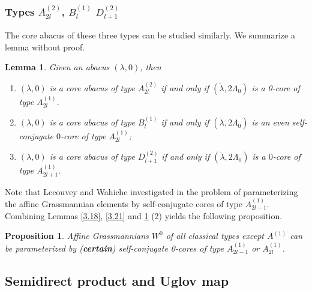 \documentclass[11pt]{amsart}
\theoremstyle{plain}
\numberwithin{equation}{subsection}
\newtheorem{lemma}[theorem]{Lemma}
\newtheorem{proposition}[theorem]{Proposition}
\newcommand{\lam}{\lambda}
\begin{document}

\subsubsection {Types $A_{2l}^{(2)}$, $B_{l}^{(1)}$ $D_{l+1}^{(2)}$} The core abacus of these three types can be studied similarly. We summarize a lemma without proof.

\begin{lemma} \label{3.25}
Given an abacus $(\lam, 0)$, then
\begin{enumerate}
\item[{\rm (1)}] $(\lambda, 0)$ is a core abacus of type $A_{2l}^{(2)}$ 
if and only if $(\ddot{\lambda},2\Lambda_0)$ is a 0-core of type $A_{2l}^{(1)}$.
\item[{\rm (2)}] $(\lambda, 0)$ is a core abacus of type $B_{l}^{(1)}$ 
if and only if $(\ddot{\lambda},2\Lambda_0)$ is an even self-conjugate $0$-core of type $A_{2l}^{(1)}$;
\item[{\rm (3)}] $(\lambda, 0)$ is a core abacus of type $D_{l+1}^{(2)}$ 
if and only if $ (\ddot{\lambda},2\Lambda_0)$ is a $0$-core of type $A_{2l+1}^{(1)}$.
\end{enumerate}
\end{lemma}

Note that Lecouvey and Wahiche investigated in \cite{LW} the problem of 
parameterizing the affine Grassmannian elements by self-conjugate cores of type $A_{2l-1}^{(1)}$.
Combining Lemmas \ref{3.18}, \ref{3.21} and \ref{3.25} (2) yields the following proposition.

\begin{proposition}
Affine Grassmannians $W^0$ of all classical types except $A^{(1)}$ 
can be parameterized by {\rm ({\bf certain})} self-conjugate 0-cores of type $A_{2l-1}^{(1)}$ or $A_{2l}^{(1)}$.
\end{proposition}


\smallskip



\subsection{Semidirect product and Uglov map}
\end{document}
